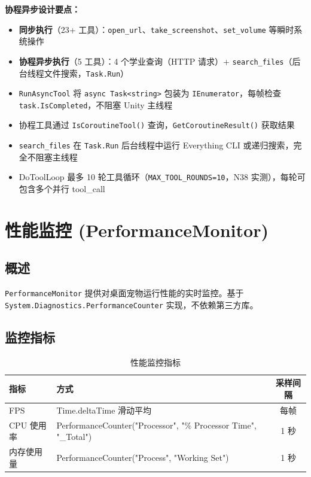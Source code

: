 \documentclass[12pt,a4paper]{ctexart}
\begin{document}
\textbf{协程异步设计要点：}
\begin{itemize}
    \item \textbf{同步执行}（23+ 工具）：\texttt{open\_url}、\texttt{take\_screenshot}、\texttt{set\_volume} 等瞬时系统操作
    \item \textbf{协程异步执行}（5 工具）：4 个学业查询（HTTP 请求）+ \texttt{search\_files}（后台线程文件搜索，\texttt{Task.Run}）
    \item \texttt{RunAsyncTool} 将 \texttt{async Task<string>} 包装为 \texttt{IEnumerator}，每帧检查 \texttt{task.IsCompleted}，不阻塞 Unity 主线程
    \item 协程工具通过 \texttt{IsCoroutineTool()} 查询，\texttt{GetCoroutineResult()} 获取结果
    \item \texttt{search\_files} 在 \texttt{Task.Run} 后台线程中运行 Everything CLI 或递归搜索，完全不阻塞主线程
    \item DoToolLoop 最多 10 轮工具循环（\texttt{MAX\_TOOL\_ROUNDS=10}，N38 实测），每轮可包含多个并行 tool\_call
\end{itemize}

\section{性能监控 (PerformanceMonitor)}

\subsection{概述}

\texttt{PerformanceMonitor} 提供对桌面宠物运行性能的实时监控。基于 \texttt{System.Diagnostics.PerformanceCounter} 实现，不依赖第三方库。

\subsection{监控指标}

\begin{table}[H]
\centering
\caption{性能监控指标}
\label{tab:perf-metrics}
\begin{tabular}{llc}
\toprule
\textbf{指标} & \textbf{方式} & \textbf{采样间隔} \\
\midrule
FPS & Time.deltaTime 滑动平均 & 每帧 \\
CPU 使用率 & PerformanceCounter("Processor", "\% Processor Time", "\_Total") & 1 秒 \\
内存使用量 & PerformanceCounter("Process", "Working Set") & 1 秒 \\
\bottomrule
\end{tabular}
\end{table}
\end{document}
